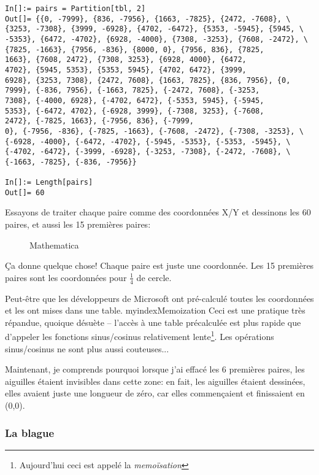 \begin{lstlisting}[style=custommath]
In[]:= pairs = Partition[tbl, 2]
Out[]= {{0, -7999}, {836, -7956}, {1663, -7825}, {2472, -7608}, \
{3253, -7308}, {3999, -6928}, {4702, -6472}, {5353, -5945}, {5945, \
-5353}, {6472, -4702}, {6928, -4000}, {7308, -3253}, {7608, -2472}, \
{7825, -1663}, {7956, -836}, {8000, 0}, {7956, 836}, {7825, 
1663}, {7608, 2472}, {7308, 3253}, {6928, 4000}, {6472, 
4702}, {5945, 5353}, {5353, 5945}, {4702, 6472}, {3999, 
6928}, {3253, 7308}, {2472, 7608}, {1663, 7825}, {836, 7956}, {0, 
7999}, {-836, 7956}, {-1663, 7825}, {-2472, 7608}, {-3253, 
7308}, {-4000, 6928}, {-4702, 6472}, {-5353, 5945}, {-5945, 
5353}, {-6472, 4702}, {-6928, 3999}, {-7308, 3253}, {-7608, 
2472}, {-7825, 1663}, {-7956, 836}, {-7999, 
0}, {-7956, -836}, {-7825, -1663}, {-7608, -2472}, {-7308, -3253}, \
{-6928, -4000}, {-6472, -4702}, {-5945, -5353}, {-5353, -5945}, \
{-4702, -6472}, {-3999, -6928}, {-3253, -7308}, {-2472, -7608}, \
{-1663, -7825}, {-836, -7956}}

In[]:= Length[pairs]
Out[]= 60
\end{lstlisting}

Essayons de traiter chaque paire comme des coordonnées X/Y et dessinons les 60 paires,
et aussi les 15 premières paires:

\begin{figure}[H]
\centering
{}
\caption{Mathematica}
\end{figure}

Ça donne quelque chose!
Chaque paire est juste une coordonnée.
Les 15 premières paires sont les coordonnées pour $\frac{1}{4}$ de cercle.

Peut-être que les développeurs de Microsoft ont pré-calculé toutes les coordonnées
et les ont mises dans une table.
myindex{Memoization}
Ceci est une pratique très répandue, quoique désuète -- l'accès à une table précalculée
est plus rapide que d'appeler les fonctions sinus/cosinus relativement lente\footnote{Aujourd'hui
ceci est appelé la \emph{memoïsation}}.
Les opérations sinus/cosinus ne sont plus aussi couteuses...

Maintenant, je comprends pourquoi lorsque j'ai effacé les 6 premières paires, les
aiguilles étaient invisibles dans cette zone: en fait, les aiguilles étaient dessinées,
elles avaient juste une longueur de zéro, car elles commençaient et finissaient en (0,0).

\subsubsection{La blague}

